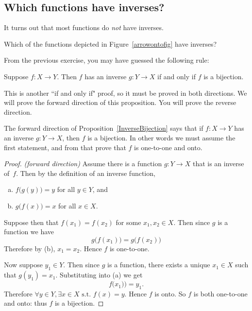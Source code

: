 \subsection{Which functions have inverses?}

It turns out that most functions do \emph{not} have inverses.  

\begin{exercise}{92}
Which of the functions depicted  in Figure~\ref{arrowontofig} have inverses?
 \end{exercise}

From the previous exercise, you may have guessed the following rule:

 \begin{thm} \label{InverseBijection}
 Suppose $f\colon X \to Y$. Then $f$ has an inverse $g \colon Y \to X$ if and only if $f$ is a bijection.
 \end{thm}
 
 This is another ``if and only if" proof, so it must be proved in both directions. We will prove the forward direction of this proposition.  You will prove the reverse direction.
 
 \begin{scratchwork}
 The forward direction of Proposition~\ref{InverseBijection} says that if $f \colon X \to Y$ has an inverse $g \colon Y \to X$, then $f$ is a bijection.  In other words we must assume the first statement, and from that prove that $f$ is one-to-one and onto.
 \end{scratchwork}
 
 \begin{proof} \emph{(forward direction)}
 Assume there is a function $g \colon Y \to X$ that is an inverse of~$f$. Then by the definition of an inverse function,
\begin{enumerate}[(a)]
\item $f \bigl( g(y) \bigr) = y$ for all $y \in Y$, and
\item $g \bigl( f(x) \bigr) = x$ for all $x \in X$.
\end{enumerate}
Suppose then that $f(x_1) = f(x_2)$ for some $x_1, x_2 \in X$.  Then since $g$ is a function we have
$$g \bigl( f(x_1) \bigr) = g \bigl( f(x_2) \bigr)$$
Therefore by (b), $x_1 = x_2$. Hence $f$ is one-to-one.

\noindent
Now suppose $y_1 \in Y$.  Then since $g$ is a function, there exists a unique  $x_1 \in X$ such that $g(y_1) = x_1$.  Substituting into (a) we get
\[f \bigl(x_1) \bigr) = y_1.\]
Therefore $\forall y \in Y, \exists x \in X \mbox{ s.t. } f(x) = y$.  Hence $f$ is onto.
So $f$ is both one-to-one and onto: thus $f$ is a bijection.
 \end{proof}

